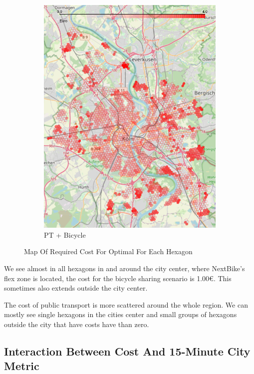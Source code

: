 \begin{figure}
\begin{subfigure}[b]{0.3\textwidth}
         \includegraphics[width=\textwidth]{Figures/results/cost/bicycle_public_transport_cost_map}
         \caption{PT + Bicycle}
         \label{fig:bicycle_public_transport_cost_map}
     \end{subfigure}
       \caption{Map Of Required Cost For Optimal For Each Hexagon}
        \label{fig:cost_map_per_scenario}
\end{figure}
We see almost in all hexagons in and around the city center, where NextBike's flex zone is located, the cost for the bicycle sharing scenario is 1.00€.
This sometimes also extends outside the city center.

The cost of public transport is more scattered around the whole region. 
We can mostly see single hexagons in the cities center and small groups of hexagons outside the city that have costs have than zero.

\subsection{Interaction Between Cost And 15-Minute City Metric}
\label{subsec:interaction_between_cost_and_15_minute_city_metric}

